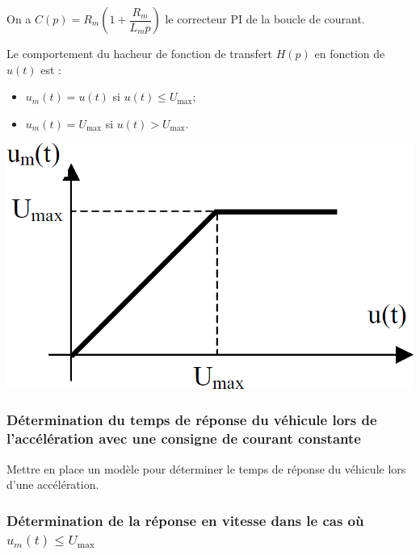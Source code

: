 \documentclass[10pt,fleqn]{article} %
\begin{document}
On a $C(p)=R_m\left( 1+\dfrac{R_m}{L_m p}\right)$ le correcteur PI de la boucle de courant.

\begin{minipage}[c]{.65\linewidth}
Le comportement du hacheur de fonction de transfert $H(p)$ en fonction de $u(t)$ est :
\begin{itemize}
\item $u_m(t) = u(t)$ si $u (t) \leq U_{\text{max}}$;
\item $u_m(t) = U_{\text{max}}$ si $u (t) > U_{\text{max}}$.
\end{itemize}
\end{minipage} \hfill
\begin{minipage}[c]{.3\linewidth}
\begin{center}
\includegraphics[width=\linewidth]{images/ccmp_02}
\end{center}
\end{minipage}

\subsubsection*{Détermination du temps de réponse du véhicule lors de l’accélération avec une consigne de courant constante}

\begin{obj}
Mettre en place un modèle pour déterminer le temps de réponse du véhicule lors d’une accélération.
\end{obj}

\subsubsection*{Détermination de la réponse en vitesse dans le cas où $u_m(t) \leq U_{\text{max}}$}
\end{document}

